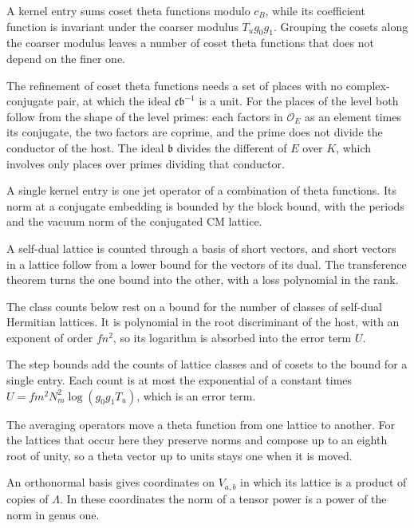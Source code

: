 A kernel entry sums coset theta functions modulo $c_B$, while its coefficient function is invariant
under the coarser modulus $T_ug_0g_1$. Grouping the cosets along the coarser modulus leaves a number
of coset theta functions that does not depend on the finer one.

The refinement of coset theta functions needs a set of places with no complex-conjugate pair, at which
the ideal $\mathfrak c\mathfrak b^{-1}$ is a unit. For the places of the level both follow from the shape
of the level primes: each factors in $\mathcal O_E$ as an element times its conjugate, the two factors
are coprime, and the prime does not divide the conductor of the host. The ideal $\mathfrak b$ divides the
different of $E$ over $K$, which involves only places over primes dividing that conductor.

A single kernel entry is one jet operator of a combination of theta functions. Its norm at a
conjugate embedding is bounded by the block bound, with the periods and the vacuum norm of the
conjugated CM lattice.

A self-dual lattice is counted through a basis of short vectors, and short vectors in a lattice
follow from a lower bound for the vectors of its dual. The transference theorem turns the one bound
into the other, with a loss polynomial in the rank.

The class counts below rest on a bound for the number of classes of self-dual Hermitian lattices.
It is polynomial in the root discriminant of the host, with an exponent of order $fn^2$, so its
logarithm is absorbed into the error term $U$.

The step bounds add the counts of lattice classes and of cosets to the bound for a single entry. Each
count is at most the exponential of a constant times $U=fm^2N_m^2\log(g_0g_1T_u)$, which is an error
term.

The averaging operators move a theta function from one lattice to another. For the lattices that
occur here they preserve norms and compose up to an eighth root of unity, so a theta vector up to
units stays one when it is moved.

An orthonormal basis gives coordinates on $V_{a,b}$ in which its lattice is a product of copies of
$\Lambda$. In these coordinates the norm of a tensor power is a power of the norm in genus one.

